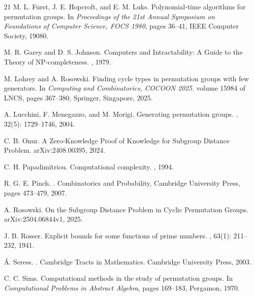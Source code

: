 \documentclass{article}
\begin{document}
\begin{thebibliography}{21}
M. L. Furst, J. E. Hopcroft, and E. M. Luks.
\newblock Polynomial-time algorithms for permutation groups.
\newblock In {\em Proceedings of the 21st Annual Symposium on Foundations of Computer Science, FOCS 1980}, pages 36--41, IEEE Computer Society, 19080.

M. R. Garey and D. S. Johnson.
\newblock Computers and Intractability: A Guide to the Theory of NP-completeness.
, 1979.

M. Lohrey and A. Rosowski.
\newblock Finding cycle types in permutation groups with few generators.
\newblock In {\em Computing and Combinatorics, COCOON 2025.} volume 15984 of LNCS, pages 367--380, Springer, Singapore, 2025.

A. Lucchini, F. Menegazzo, and M. Morigi.
\newblock Generating permutation groups.
, 32(5): 1729--1746, 2004.

C. B. Onur.
\newblock A Zero-Knowledge Proof of Knowledge for Subgroup Distance Problem.
\newblock arXiv:2408.00395, 2024.

C. H. Papadimitriou.
\newblock Computational complexity.
, 1994.

R. G. E. Pinch.
.
\newblock Combinatorics and Probability, Cambridge University Press, pages 473--479, 2007.

A. Rosowski.
\newblock On the Subgroup Distance Problem in Cyclic Permutation Groups.
\newblock arXiv:2504.06844v1, 2025.

J. B. Rosser.
\newblock Explicit bounds for some functions of prime numbers.
, 63(1): 211--232, 1941.

{\'A}. Seress.
.
\newblock Cambridge Tracts in Mathematics. Cambridge University Press, 2003.

C. C. Sims.
\newblock Computational methods in the study of permutation groups.
\newblock In {\em Computational Problems in Abstract Algebra}, pages 169--183, Pergamon, 1970.

\end{thebibliography}
\end{document}
